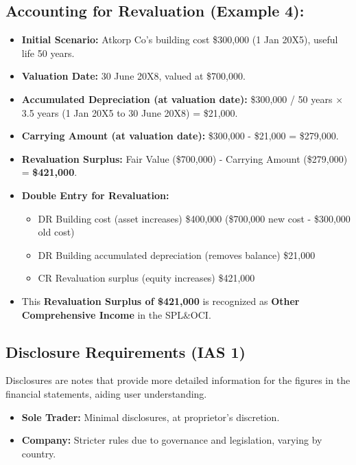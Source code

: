 \subsection*{Accounting for Revaluation (Example 4):}

\begin{itemize}
    \item \textbf{Initial Scenario:} Atkorp Co's building cost \$300,000 (1 Jan 20X5), useful life 50 years.
    \item \textbf{Valuation Date:} 30 June 20X8, valued at \$700,000.
    \item \textbf{Accumulated Depreciation (at valuation date):} \$300,000 / 50 years $\times$ 3.5 years (1 Jan 20X5 to 30 June 20X8) = \$21,000.
    \item \textbf{Carrying Amount (at valuation date):} \$300,000 - \$21,000 = \$279,000.
    \item \textbf{Revaluation Surplus:} Fair Value (\$700,000) - Carrying Amount (\$279,000) = \textbf{\$421,000}.
\end{itemize}

\begin{itemize}
    \item \textbf{Double Entry for Revaluation:}
    \begin{itemize}
        \item DR Building cost (asset increases) \$400,000 (\$700,000 new cost - \$300,000 old cost)
        \item DR Building accumulated depreciation (removes balance) \$21,000
        \item CR Revaluation surplus (equity increases) \$421,000
    \end{itemize}
    \item This \textbf{Revaluation Surplus of \$421,000} is recognized as \textbf{Other Comprehensive Income} in the SPL\&OCI.
\end{itemize}

\subsection{Disclosure Requirements (IAS 1)}

Disclosures are notes that provide more detailed information for the figures in the financial statements, aiding user understanding.

\begin{itemize}
    \item \textbf{Sole Trader:} Minimal disclosures, at proprietor's discretion.
    \item \textbf{Company:} Stricter rules due to governance and legislation, varying by country.
\end{itemize}

